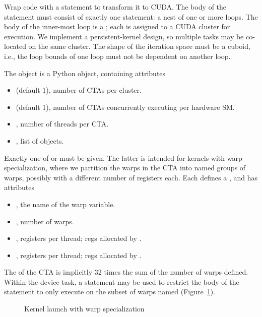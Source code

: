 
Wrap code with a  statement to transform it to CUDA.
The body of the  statement must consist of exactly one statement: a nest of one or more  loops.
The body of the inner-most  loop is a ; each is assigned to a CUDA cluster for execution.
We implement a persistent-kernel design, so multiple tasks may be co-located on the same cluster.
The shape of the  iteration space must be a cuboid, i.e., the loop bounds of one  loop must not be dependent on another  loop.

The  object is a Python object, containing attributes
\begin{itemize}
  \item {} (default 1), number of CTAs per cluster.
  \item {} (default 1), number of CTAs concurrently executing per hardware SM.
  \item {}, number of threads per CTA.
  \item {}, list of  objects.
\end{itemize}
Exactly one of  or  must be given.
The latter is intended for kernels with warp specialization, where we partition the warps in the CTA into named groups of warps, possibly with a different number of registers each.
Each  defines a , and has attributes
\begin{itemize}
  \item {}, the name of the warp variable.
  \item {}, number of warps.
  \item {}, registers per thread; regs allocated by .
  \item {}, registers per thread; regs allocated by .
\end{itemize}
The  of the CTA is implicitly 32 times the sum of the number of warps defined.
Within the device task, a  statement may be used to restrict the body of the statement to only execute on the subset of warps named (Figure~\ref{fig:CudaDeviceFunction0}).

\begin{figure}[h]
\codehrule

\caption{Kernel launch with warp specialization}
\label{fig:CudaDeviceFunction0}
\codehrule
\end{figure}
